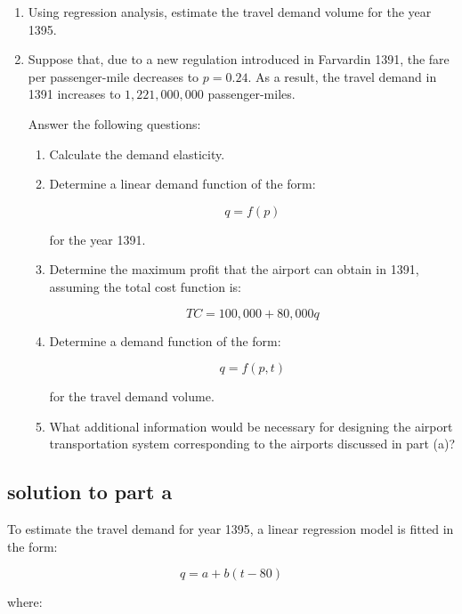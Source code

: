 \documentclass{KPS_assignment}
\begin{document}
\begin{enumerate}

\item Using regression analysis, estimate the travel demand volume for the year 1395.

\item Suppose that, due to a new regulation introduced in Farvardin 1391, the fare per passenger-mile decreases to $p = 0.24$. As a result, the travel demand in 1391 increases to $1{,}221{,}000{,}000$ passenger-miles.

Answer the following questions:

\begin{enumerate}
    \item Calculate the demand elasticity.
    
    \item Determine a linear demand function of the form:
    
    \[
    q = f(p)
    \]
    
    for the year 1391.
    
    \item Determine the maximum profit that the airport can obtain in 1391, assuming the total cost function is:
    
    \[
    TC = 100{,}000 + 80{,}000q
    \]
    
    \item Determine a demand function of the form:
    
    \[
    q = f(p,t)
    \]
    
    for the travel demand volume.
    
    \item What additional information would be necessary for designing the airport transportation system corresponding to the airports discussed in part (a)?
    
\end{enumerate}

\end{enumerate}

\subsection{solution to part a}

To estimate the travel demand for year 1395, a linear regression model is fitted in the form:

\[
q = a + b(t-80)
\]

where:
\end{document}
